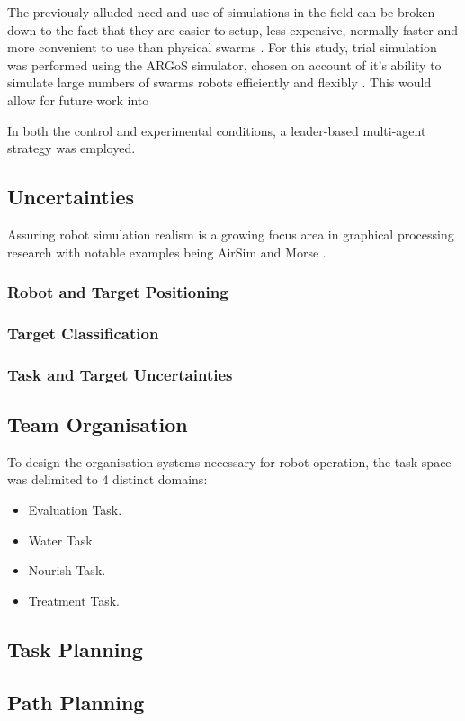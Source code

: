 \documentclass{report}
\begin{document}
The previously alluded need and use of simulations in the field can be broken down to the fact that they are easier to setup, less expensive, normally faster and more convenient to use than physical swarms \cite{WeBot2004}. For this study, trial simulation was performed using the ARGoS simulator, chosen on account of it's ability to simulate large numbers of swarms robots efficiently and flexibly \cite{Pinciroli2014}. This would allow for future work into

In both the control and experimental conditions, a leader-based multi-agent strategy was employed.

\subsection{Uncertainties}
Assuring robot simulation realism is a growing focus area in graphical processing research with notable examples being AirSim \cite{Shah} and Morse \cite{Morse2011}.

\subsubsection{Robot and Target Positioning}
\subsubsection{Target Classification}
\subsubsection{Task and Target Uncertainties}


\subsection{Team Organisation}
To design the organisation systems necessary for robot operation, the task space was delimited to 4 distinct domains:
\begin{itemize}
	\item Evaluation Task.
	\item Water Task.
	\item Nourish Task.
	\item Treatment Task.
\end{itemize}

\subsection{Task Planning}
\subsection{Path Planning}
\end{document}
